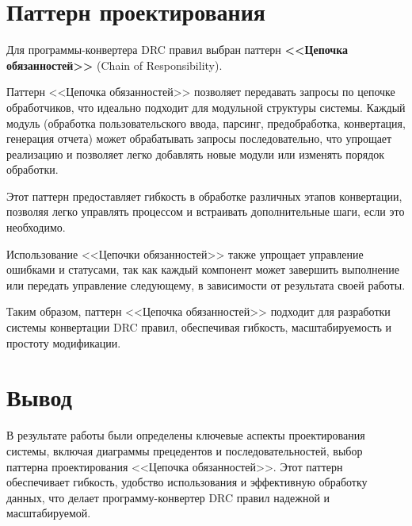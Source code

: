 \section{Паттерн проектирования}

Для программы-конвертера DRC правил выбран паттерн
\textbf{<<Цепочка обязанностей>>} (Chain of Responsibility).\par
Паттерн <<Цепочка обязанностей>> позволяет передавать запросы
по цепочке обработчиков,
что идеально подходит для модульной структуры системы.
Каждый модуль (обработка пользовательского ввода, парсинг,
предобработка, конвертация, генерация отчета)
может обрабатывать запросы последовательно,
что упрощает реализацию и позволяет легко добавлять новые модули
или изменять порядок обработки.\par
Этот паттерн предоставляет гибкость в обработке различных этапов конвертации,
позволяя легко управлять процессом и встраивать дополнительные шаги,
если это необходимо.\par
Использование <<Цепочки обязанностей>> также упрощает управление ошибками
и статусами, так как каждый компонент может завершить выполнение
или передать управление следующему,
в зависимости от результата своей работы.\par
Таким образом, паттерн <<Цепочка обязанностей>> подходит
для разработки системы конвертации DRC правил, обеспечивая гибкость,
масштабируемость и простоту модификации.

\clearpage

\section*{\LARGE Вывод}

В результате работы были определены ключевые аспекты проектирования системы,
включая диаграммы прецедентов и последовательностей,
выбор паттерна проектирования <<Цепочка обязанностей>>.
Этот паттерн обеспечивает гибкость, удобство использования
и эффективную обработку данных,
что делает программу-конвертер DRC правил надежной и масштабируемой.


